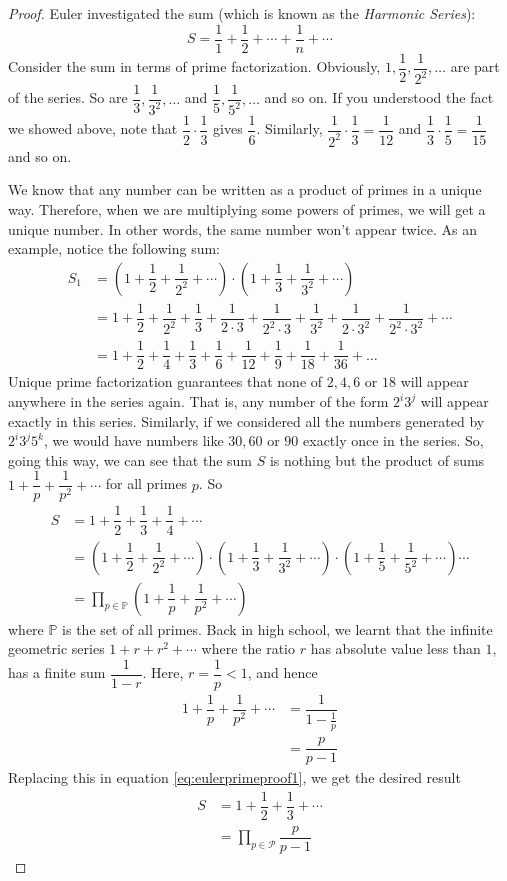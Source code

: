 \documentclass{subfiles}
\begin{document}
		\begin{proof}
			Euler investigated the sum (which is known as the \textit{Harmonic Series}):
			\[S=\dfrac11+\dfrac12+\cdots+\dfrac1n+\cdots\]
			Consider the sum in terms of prime factorization. Obviously, $1,\dfrac12,\dfrac1{2^2},\ldots$ are part of the series. So are $\dfrac13,\dfrac1{3^2},\ldots$ and $\dfrac15,\dfrac1{5^2},\ldots$ and so on. If you understood the fact we showed above, note that $\dfrac12\cdot\dfrac13$ gives $\dfrac16$. Similarly, $\dfrac1{2^2}\cdot\dfrac13=\dfrac1{12}$ and $\dfrac13\cdot\dfrac15=\dfrac1{15}$ and so on.

			We know that any number can be written as a product of primes in a unique way. Therefore, when we are multiplying some powers of primes, we will get a unique number. In other words, the same number won't appear twice. As an example, notice the following sum:
				\begin{align*}
					S_1 & =  \left(1+\dfrac12+\dfrac1{2^2}+\cdots\right)\cdot\left(1+\dfrac13+\dfrac1{3^2}+\cdots\right)\\
					& =  1+\dfrac12+\dfrac1{2^2}+\dfrac13+\dfrac1{2\cdot3}+\dfrac1{2^2\cdot3}+\dfrac1{3^2}+\dfrac1{2\cdot3^2}+\dfrac1{2^2\cdot3^2}+\cdots\\
					& =  1+\dfrac12+\dfrac14+\dfrac13+\dfrac16+\dfrac1{12}+\dfrac19+\dfrac1{18}+\dfrac1{36}+\ldots
				\end{align*}
			Unique prime factorization guarantees that none of $2,4,6$ or $18$ will appear anywhere in the series again. That is, any number of the form $2^i3^j$ will appear exactly in this series. Similarly, if we considered all the numbers generated by $2^i3^j5^k$, we would have numbers like $30, 60$ or $90$ exactly once in the series. So, going this way, we can see that the sum $S$ is nothing but the product of sums $1+\dfrac1p+\dfrac1{p^2}+\cdots$ for all primes $p$. So
				\begin{align}
					S	& =  1+\dfrac12+\dfrac13+\dfrac14+\cdots\nonumber\\
						& =  \left(1+\dfrac12+\dfrac1{2^2}+\cdots\right)\cdot\left(1+\dfrac13+\dfrac1{3^2}+\cdots\right)\cdot\left(1+\dfrac15+\dfrac1{5^2}+\cdots\right) \cdots\nonumber\\
						& = \prod_{p\in\mathbb P}\left(1+\dfrac1p+\dfrac1{p^2}+\cdots\right)\label{eq:eulerprimeproof1}
				\end{align}
			where $\mathbb P$ is the set of all primes. Back in high school, we learnt that the infinite geometric series $1+r+r^2+\cdots$ where the ratio $r$ has absolute value less than $1$, has a finite sum $\dfrac1{1-r}$. Here, $r=\dfrac1p<1$, and hence
				\begin{align*}
					1+\dfrac1p+\dfrac1{p^2}+\cdots  & =\dfrac1{1-\frac1p}\\
												&=\dfrac p{p-1}
				\end{align*}
			Replacing this in equation \eqref{eq:eulerprimeproof1}, we get the desired result
				\begin{align*}
					S   & = 1+\dfrac12+\dfrac13+\cdots\\
						& =\prod_{p\in\mathcal P}\dfrac p{p-1}
				\end{align*}
		\end{proof}
\end{document}
